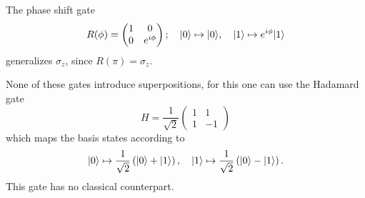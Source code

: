 The phase shift gate
\begin{equation}
  R(\phi) =
  \begin{pmatrix}
    1 & 0 \\
    0 & e^{i\phi}
  \end{pmatrix};\quad
  \lvert0\rangle \mapsto \lvert0\rangle,\quad
  \lvert1\rangle \mapsto e^{i\phi} \lvert1\rangle
\end{equation}
generalizes $σ_z$, since $R(\pi) = \sigma_z$.

None of these gates introduce superpositions, for this one can use the Hadamard gate
\begin{equation}\label{eq:hadamard}
  H = \frac{1}{\sqrt{2}} \begin{pmatrix} 1 & 1 \\ 1 & -1 \end{pmatrix}
\end{equation}
which maps the basis states according to
\begin{equation}
  \lvert0\rangle \mapsto \frac{1}{\sqrt{2}} \left( \lvert0\rangle + \lvert1\rangle \right), \quad
  \lvert1\rangle \mapsto \frac{1}{\sqrt{2}} \left( \lvert0\rangle - \lvert1\rangle \right).
\end{equation}
This gate has no classical counterpart.

